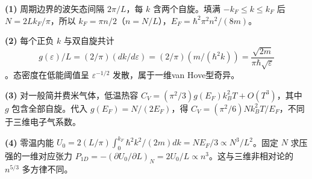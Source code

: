 \par\noindent\textbf{(1)} 周期边界的波矢态间隔 \(2\pi/L\)，每 \(k\) 含两个自旋。填满 \(-k_F\le k\le k_F\) 后 \(N=2Lk_F/\pi\)，所以 \(k_F=\pi n/2\)（\(n=N/L\)），\(E_F=\hbar^2\pi^2n^2/(8m)\)。
\par\noindent\textbf{(2)} 每个正负 \(k\) 与双自旋共计 \[g(\varepsilon)/L=(2/\pi)(dk/d\varepsilon)=(2/\pi)(m/(\hbar^2k))=\frac{\sqrt{2m}}{\pi\hbar\sqrt\varepsilon}\]。态密度在低能阈值呈 \(\varepsilon^{-1/2}\) 发散，属于一维van Hove型奇异。
\par\noindent\textbf{(3)} 对一般简并费米气体，低温热容 \(C_V=(\pi^2/3)g(E_F)k_B^2T+O(T^3)\)，其中 \(g\) 包含全部自旋。代入 \(g(E_F)=N/(2E_F)\)，得 \(C_V=(\pi^2/6)Nk_B^2T/E_F\)，不同于三维电子气系数。
\par\noindent\textbf{(4)} 零温内能 \(U_0=2(L/\pi)\int_0^{k_F}\hbar^2k^2/(2m)dk=NE_F/3\propto N^3/L^2\)。固定 \(N\) 求压强的一维对应张力 \(P_{1D}=-(\partial U_0/\partial L)_N=2U_0/L\propto n^3\)。这与三维非相对论的 \(n^{5/3}\) 多方律不同。
